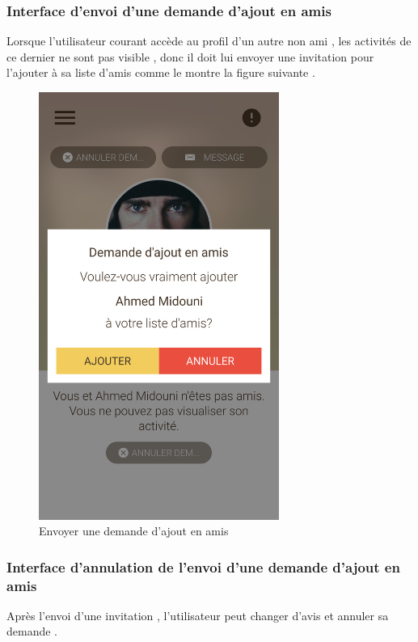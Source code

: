 \documentclass[11pt,a4paper,oneside]{book}
\begin{document}
					\subsubsection{Interface d'envoi d'une demande d'ajout en amis}
					Lorsque l’utilisateur courant accède au profil d’un autre non ami , les activités de ce dernier ne sont pas visible , donc il doit lui envoyer une invitation pour l’ajouter à sa liste d’amis comme le montre la figure suivante .
					\begin{figure}[H]
						\centering
						\includegraphics[width=0.7\textwidth]{../Maquettes/Hanimo-maquettes/Output/05-View-User-Friend-Request}
						\caption{Envoyer une demande d'ajout en amis }
						\label{fig:05-view-user-friend-request}
					\end{figure}
				\vfill
				
					\subsubsection{Interface d’annulation de l’envoi d’une demande d’ajout en amis}
					Après l’envoi d’une invitation , l'utilisateur peut changer d’avis et annuler sa demande .
					
\end{document}
